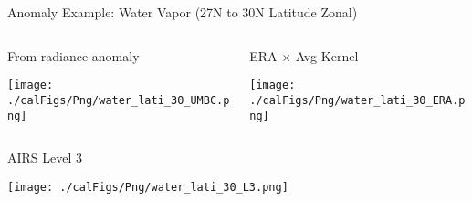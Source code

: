 \documentclass[10pt,t]{beamer}
\begin{document}
\begin{frame}[label={sec:org70a112c}]{Anomaly Example: Water Vapor (27N to 30N Latitude Zonal)}
\vspace{-0.35in}

\begin{columns}
\begin{column}{0.55\columnwidth}
\begin{block}{\footnotesize From radiance anomaly}
\vspace{-0.1in}
\begin{center}
\texttt{[image: ./calFigs/Png/water\_lati\_30\_UMBC.png]}
\end{center}
\end{block}
\end{column}

\begin{column}{0.55\columnwidth}
\begin{block}{\footnotesize ERA \(\times\) Avg Kernel}
\vspace{-0.1in}
\begin{center}
\texttt{[image: ./calFigs/Png/water\_lati\_30\_ERA.png]}
\end{center}
\end{block}
\end{column}
\end{columns}

\vspace{-0.15in}
\begin{columns}
\begin{column}{0.55\columnwidth}
\begin{block}{\footnotesize AIRS Level 3}
\vspace{-0.1in}
\begin{center}
\texttt{[image: ./calFigs/Png/water\_lati\_30\_L3.png]}
\end{center}
\end{block}
\end{column}
\end{columns}
\end{frame}
\end{document}
